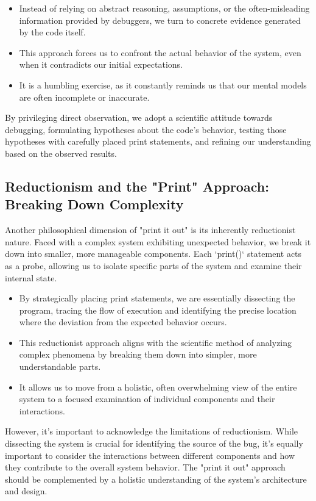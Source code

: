 \documentclass{article}
\begin{document}
{{{{\begin{itemize}
    \item Instead of relying on abstract reasoning, assumptions, or the often-misleading information provided by debuggers, we turn to concrete evidence generated by the code itself.
    \item This approach forces us to confront the actual behavior of the system, even when it contradicts our initial expectations.
    \item It is a humbling exercise, as it constantly reminds us that our mental models are often incomplete or inaccurate.
\end{itemize}

By privileging direct observation, we adopt a scientific attitude towards debugging, formulating hypotheses about the code's behavior, testing those hypotheses with carefully placed print statements, and refining our understanding based on the observed results.

\subsection*{Reductionism and the "Print" Approach: Breaking Down Complexity}

Another philosophical dimension of "print it out" is its inherently reductionist nature. Faced with a complex system exhibiting unexpected behavior, we break it down into smaller, more manageable components. Each `print()` statement acts as a probe, allowing us to isolate specific parts of the system and examine their internal state.

\begin{itemize}
    \item By strategically placing print statements, we are essentially dissecting the program, tracing the flow of execution and identifying the precise location where the deviation from the expected behavior occurs.
    \item This reductionist approach aligns with the scientific method of analyzing complex phenomena by breaking them down into simpler, more understandable parts.
    \item It allows us to move from a holistic, often overwhelming view of the entire system to a focused examination of individual components and their interactions.
\end{itemize}

However, it's important to acknowledge the limitations of reductionism. While dissecting the system is crucial for identifying the source of the bug, it's equally important to consider the interactions between different components and how they contribute to the overall system behavior. The "print it out" approach should be complemented by a holistic understanding of the system's architecture and design.

}}}}
\end{document}
